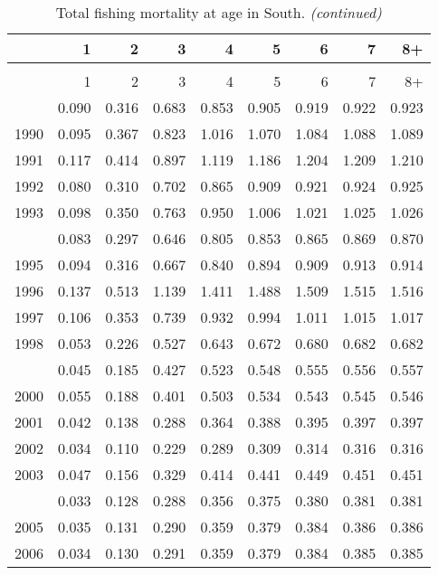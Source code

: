 \documentclass[
]{article}
\begin{document}
\begin{longtable}[t]{lrrrrrrrr}
\caption{\label{tab:South-region-FAA-table}Total fishing mortality at age in South.}\\
\toprule
  & 1 & 2 & 3 & 4 & 5 & 6 & 7 & 8+\\
\midrule
\endfirsthead
\caption[]{Total fishing mortality at age in South. \textit{(continued)}}\\
\toprule
  & 1 & 2 & 3 & 4 & 5 & 6 & 7 & 8+\\
\midrule
\endhead

\endfoot
\bottomrule
\endlastfoot
1989 & 0.090 & 0.316 & 0.683 & 0.853 & 0.905 & 0.919 & 0.922 & 0.923\\
1990 & 0.095 & 0.367 & 0.823 & 1.016 & 1.070 & 1.084 & 1.088 & 1.089\\
1991 & 0.117 & 0.414 & 0.897 & 1.119 & 1.186 & 1.204 & 1.209 & 1.210\\
1992 & 0.080 & 0.310 & 0.702 & 0.865 & 0.909 & 0.921 & 0.924 & 0.925\\
1993 & 0.098 & 0.350 & 0.763 & 0.950 & 1.006 & 1.021 & 1.025 & 1.026\\
\addlinespace
1994 & 0.083 & 0.297 & 0.646 & 0.805 & 0.853 & 0.865 & 0.869 & 0.870\\
1995 & 0.094 & 0.316 & 0.667 & 0.840 & 0.894 & 0.909 & 0.913 & 0.914\\
1996 & 0.137 & 0.513 & 1.139 & 1.411 & 1.488 & 1.509 & 1.515 & 1.516\\
1997 & 0.106 & 0.353 & 0.739 & 0.932 & 0.994 & 1.011 & 1.015 & 1.017\\
1998 & 0.053 & 0.226 & 0.527 & 0.643 & 0.672 & 0.680 & 0.682 & 0.682\\
\addlinespace
1999 & 0.045 & 0.185 & 0.427 & 0.523 & 0.548 & 0.555 & 0.556 & 0.557\\
2000 & 0.055 & 0.188 & 0.401 & 0.503 & 0.534 & 0.543 & 0.545 & 0.546\\
2001 & 0.042 & 0.138 & 0.288 & 0.364 & 0.388 & 0.395 & 0.397 & 0.397\\
2002 & 0.034 & 0.110 & 0.229 & 0.289 & 0.309 & 0.314 & 0.316 & 0.316\\
2003 & 0.047 & 0.156 & 0.329 & 0.414 & 0.441 & 0.449 & 0.451 & 0.451\\
\addlinespace
2004 & 0.033 & 0.128 & 0.288 & 0.356 & 0.375 & 0.380 & 0.381 & 0.381\\
2005 & 0.035 & 0.131 & 0.290 & 0.359 & 0.379 & 0.384 & 0.386 & 0.386\\
2006 & 0.034 & 0.130 & 0.291 & 0.359 & 0.379 & 0.384 & 0.385 & 0.385\\

\end{longtable}
\end{document}
